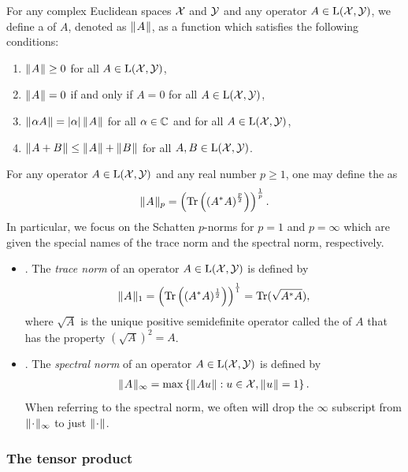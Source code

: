 For any complex Euclidean spaces $\mathcal{X}$ and $\mathcal{Y}$ and any operator $A \in \mathrm{L}(\mathcal{X},\mathcal{Y})$, we define a  of $A$, denoted as $\lVert\mspace{1mu} A \mspace{1mu}\rVert$, as a function which satisfies the following conditions:
\begin{enumerate}
	\item $\lVert\mspace{1mu} A \mspace{1mu}\rVert \geq 0$ for all $A \in \mathrm{L}(\mathcal{X},\mathcal{Y})$,
	\item $\lVert\mspace{1mu} A \mspace{1mu}\rVert = 0$ if and only if $A = 0$ for all $A \in \mathrm{L}(\mathcal{X},\mathcal{Y})$,
	\item $\lVert\mspace{1mu} \alpha A \mspace{1mu}\rVert = \left\lvert \alpha \right\rvert\lVert\mspace{1mu} A \mspace{1mu}\rVert$ for all $\alpha \in \mathbb{C}$ and for all $A \in \mathrm{L}(\mathcal{X},\mathcal{Y})$,
	\item $\lVert\mspace{1mu} A + B \mspace{1mu}\rVert \leq \lVert\mspace{1mu} A \mspace{1mu}\rVert + \lVert\mspace{1mu} B \mspace{1mu}\rVert$ for all $A,B \in \mathrm{L}(\mathcal{X},\mathcal{Y})$. 
\end{enumerate}
 For any operator $A \in \mathrm{L}(\mathcal{X},\mathcal{Y})$ and any real number $p \geq 1$, one may define the  as
\begin{align}
	\lVert\mspace{1mu} A \mspace{1mu}\rVert_p = \left( \operatorname{Tr} \left( \left( A^* A \right)^{\frac{p}{2}} \right) \right)^{\frac{1}{p}}.
\end{align}
In particular, we focus on the Schatten $p$-norms for $p = 1$ and $p = \infty$ which are given the special names of the trace norm and the spectral norm, respectively.
\begin{itemize}
	\item {}. The \emph{trace norm} of an operator $A \in \mathrm{L}(\mathcal{X},\mathcal{Y})$ is defined by
\begin{align}
	\lVert\mspace{1mu} A \mspace{1mu}\rVert_1 = \left( \operatorname{Tr}\left( (A^* A)^{\frac{1}{2}} \right) \right)^{\frac{1}{1}} = \operatorname{Tr}(\sqrt{A^*A}),
\end{align}
where $\sqrt{A}$ is the unique positive semidefinite operator called the  of $A$ that has the property $\left(\sqrt{A} \right)^2 = A$. 
	\item {}. The \emph{spectral norm} of an operator $A \in \mathrm{L}(\mathcal{X},\mathcal{Y})$ is defined by
	\begin{align}
		\lVert\mspace{1mu} A \mspace{1mu}\rVert_{\infty} = \max \left \{ \lVert\mspace{1mu} Au \mspace{1mu}\rVert : u \in \mathcal{X}, \lVert\mspace{1mu} u \mspace{1mu}\rVert = 1 \right \}.
	\end{align}
	When referring to the spectral norm, we often will drop the $\infty$ subscript from $\lVert\mspace{1mu} \cdot \mspace{1mu}\rVert_{\infty}$ to just $\lVert\mspace{1mu} \cdot \mspace{1mu}\rVert$. 
\end{itemize}

\subsubsection*{The tensor product}

